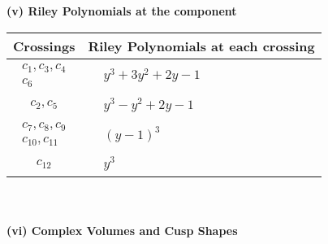 \documentclass[1p]{elsarticle_modified}
\theoremstyle{definition}
\begin{document}
\newpage\renewcommand{\arraystretch}{1}
\flushleft \textbf{(v) Riley Polynomials at the component}\newline \\
\begin{tabular}{m{50pt}|m{274pt}}
Crossings & \hspace{64pt}Riley Polynomials at each crossing \\
\hline $$\begin{aligned}c_{1},c_{3},c_{4}\\c_{6}\end{aligned}$$&$\begin{aligned}
&y^3+3 y^2+2 y-1
\end{aligned}$\\
\hline $$\begin{aligned}c_{2},c_{5}\end{aligned}$$&$\begin{aligned}
&y^3- y^2+2 y-1
\end{aligned}$\\
\hline $$\begin{aligned}c_{7},c_{8},c_{9}\\c_{10},c_{11}\end{aligned}$$&$\begin{aligned}
&(y-1)^3
\end{aligned}$\\
\hline $$\begin{aligned}c_{12}\end{aligned}$$&$\begin{aligned}
&y^3
\end{aligned}$\\
\hline
\end{tabular}\\~\\
\newpage\flushleft \textbf{(vi) Complex Volumes and Cusp Shapes}
\end{document}
